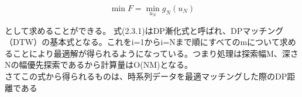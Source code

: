\documentclass[11pt,a4j,notitlepage]{jreport}
\begin{document}
\[
\min F = \min_{u_N} g_N(u_N)
\]

として求めることができる。
式(2.3.1)はDP漸化式と呼ばれ、DPマッチング（DTW）の基本式となる。これをi=1からi=Nまで順にすべてのmについて求めることにより最適解が得られるようになっている。つまり処理は探索幅M、深さNの幅優先探索であるから計算量はO(NM)となる。\\
さてこの式から得られるものは、時系列データを最適マッチングした際のDP距離である

\end{document}

